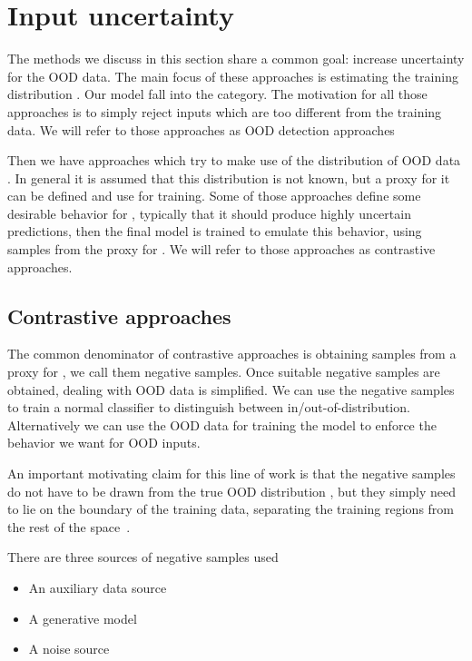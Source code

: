 \documentclass[../main.tex]{subfiles}
\begin{document}
\section{Input uncertainty}
The methods we discuss in this section share a common goal: increase uncertainty for the OOD data. The main focus of these approaches is estimating the training distribution . Our model fall into the category. The motivation for all those approaches is to simply reject inputs which are too different from the training data. We will refer to those approaches as OOD detection approaches

Then we have approaches which try to make use of the distribution of OOD data . In general it is assumed that this distribution is not known, but a proxy for it can be defined and use for training. Some of those approaches define some desirable behavior for , typically that it should produce highly uncertain predictions, then the final model is trained to emulate this behavior, using samples from the proxy for . We will refer to those approaches as contrastive approaches.



\subsection{Contrastive approaches}

The common denominator of contrastive approaches is obtaining samples from a proxy for , we call them negative samples. Once suitable negative samples are obtained, dealing with OOD data is simplified. We can use the negative samples to train a normal classifier to distinguish between in/out-of-distribution. Alternatively we can use the OOD data for training the model to enforce the behavior we want for OOD inputs. 

An important motivating claim for this line of work is that the negative samples do not have to be drawn from the true OOD distribution , but they simply need to lie on the boundary of the training data, separating the training regions from the rest of the space~\citep{lee2017training}.

There are three sources of negative samples used
\begin{itemize}
    \item An auxiliary data source
    \item A generative model
    \item A noise source
\end{itemize}{}
\end{document}
